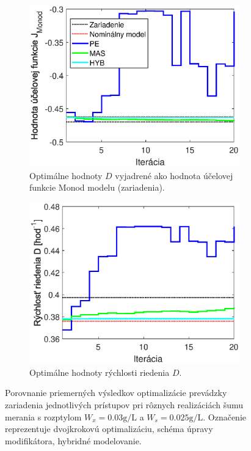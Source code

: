 \begin{figure}
	\centering
	\begin{subfigure}[b]{0.49\textwidth}
		\centering
		\includegraphics[width=\linewidth]{images/method_comparison_costFunVal_bigNoise}
		\caption{Optimálne hodnoty $ D $ vyjadrené ako hodnota účelovej funkcie Monod modelu (zariadenia).}
		\label{fig:method_comparison_costFunVal_bigNoise}
	\end{subfigure}
	\hfill
	\begin{subfigure}[b]{0.49\textwidth}
		\centering
		\includegraphics[width=\linewidth]{images/method_comparison_D_bigNoise}
		\caption{Optimálne hodnoty rýchlosti riedenia $ D $. \newline \newline}
		\label{fig:method_comparison_D_bigNoise}
	\end{subfigure}
	\caption{Porovnanie priemerných výsledkov optimalizácie prevádzky zariadenia jednotlivých prístupov pri rôznych realizáciách šumu merania s rozptylom $ W_{x} = 0.03\si{\gram\per\liter} $ a $ W_{s} = 0.025\si{\gram\per\liter} $. Označenie  reprezentuje dvojkrokovú optimalizáciu,  schéma úpravy modifikátora,  hybridné modelovanie.}
	\label{fig:method_comparison_bigNoise}
\end{figure}

